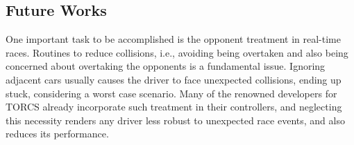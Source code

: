\subsection{Future Works} \label{subsec:Future}
	
		
	One important task to be accomplished is the opponent treatment in real-time races. Routines to reduce collisions, i.e., avoiding being overtaken and also being concerned about overtaking the opponents is a fundamental issue. Ignoring adjacent cars usually causes the driver to face unexpected collisions, ending up stuck, considering a worst case scenario. Many of the renowned developers for TORCS already incorporate such treatment in their controllers, and neglecting this necessity renders any driver less robust to unexpected race events, and also reduces its performance.
	
	